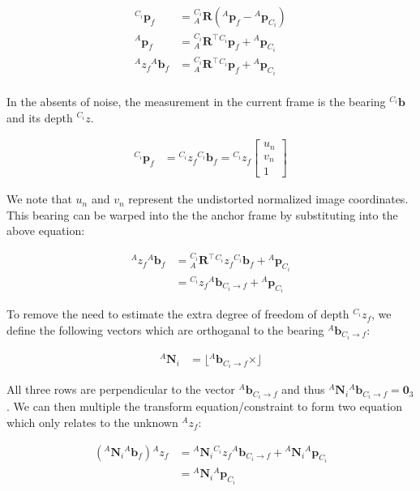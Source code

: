 \begin{align*} {}^{C_i}\mathbf{p}_{f} & = {}^{C_i}_A\mathbf{R} \left( {}^A\mathbf{p}_f - {}^A\mathbf{p}_{C_i}\right) \\ {}^A\mathbf{p}_f & = {}^{C_i}_A\mathbf{R}^\top {}^{C_i}\mathbf{p}_{f} + {}^A\mathbf{p}_{C_i} \\ {}^{A}z_{f} {}^A\mathbf{b}_f & = {}^{C_i}_A\mathbf{R}^\top {}^{C_i}\mathbf{p}_{f} + {}^A\mathbf{p}_{C_i} \\ \end{align*}

In the absents of noise, the measurement in the current frame is the bearing ${}^{C_i}\mathbf{b}$ and its depth ${}^{C_i}z$.

\begin{align*} {}^{C_i}\mathbf{p}_f & = {}^{C_i}z_{f} {}^{C_i}\mathbf{b}_{f} = {}^{C_i}z_{f} \begin{bmatrix} u_n \\ v_n \\ 1 \end{bmatrix} \end{align*}

We note that $u_n$ and $v_n$ represent the undistorted normalized image coordinates. This bearing can be warped into the the anchor frame by substituting into the above equation\+:

\begin{align*} {}^{A}z_{f} {}^A\mathbf{b}_f & = {}^{C_i}_A\mathbf{R}^\top {}^{C_i}z_{f} {}^{C_i}\mathbf{b}_{f} + {}^A\mathbf{p}_{C_i} \\ & = {}^{C_i}z_{f} {}^{A}\mathbf{b}_{C_i \rightarrow f} + {}^A\mathbf{p}_{C_i} \end{align*}

To remove the need to estimate the extra degree of freedom of depth ${}^{C_i}z_{f}$, we define the following vectors which are orthoganal to the bearing ${}^{A}\mathbf{b}_{C_i \rightarrow f}$\+:

\begin{align*} {}^{A}\mathbf{N}_i &= \lfloor {}^{A}\mathbf{b}_{C_i \rightarrow f} \times\rfloor \end{align*}

All three rows are perpendicular to the vector ${}^{A}\mathbf{b}_{C_i \rightarrow f}$ and thus ${}^{A}\mathbf{N}_i{}^{A}\mathbf{b}_{C_i \rightarrow f}=\mathbf{0}_3$. We can then multiple the transform equation/constraint to form two equation which only relates to the unknown ${}^{A}z_{f}$\+:

\begin{align*} ({}^{A}\mathbf{N}_i {}^A\mathbf{b}_f) {}^{A}z_{f} & = {}^{A}\mathbf{N}_i {}^{C_i}z_{f} {}^{A}\mathbf{b}_{C_i \rightarrow f} + {}^{A}\mathbf{N}_i {}^A\mathbf{p}_{C_i} \\ & = {}^{A}\mathbf{N}_i {}^A\mathbf{p}_{C_i} \end{align*}

